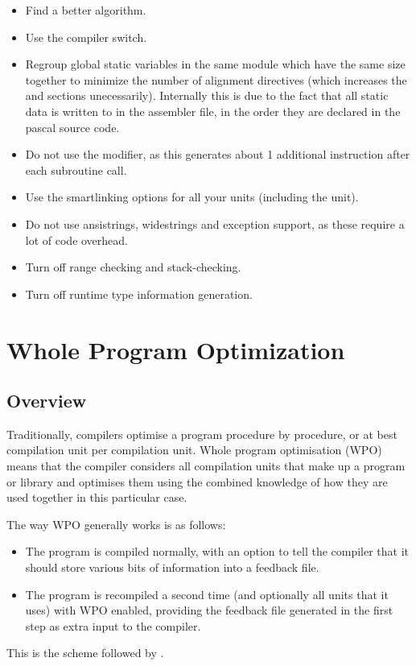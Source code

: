 \begin{itemize}

\item Find a better algorithm.

\item Use the  compiler switch.

\item Regroup global static variables in the same module which have the same
 size together to minimize the number of alignment directives (which increases
 the  and  sections unecessarily). Internally this is
 due to the fact that all static data is written to in the assembler file,
 in the order they are declared in the pascal source code.

\item Do not use the  modifier, as this generates
about 1 additional instruction after each subroutine call.

\item Use the smartlinking options for all your units
(including the  unit).

\item Do not use ansistrings, widestrings and exception support, as these 
require a lot of code overhead.

\item Turn off range checking and stack-checking.

\item Turn off runtime type information generation.

\end{itemize}

\section{Whole Program Optimization}
\label{se:WPO}

\subsection{Overview}
Traditionally, compilers optimise a program procedure by procedure, or at
best compilation unit per compilation unit. Whole program optimisation (WPO)
means that the compiler considers all compilation units that make up a
program or library and optimises them using the combined knowledge of how
they are used together in this particular case. 

The way WPO generally works is as follows: 
\begin{itemize}
\item The program is compiled normally, with an option to tell the compiler 
that it should store various bits of information into a feedback file.
\item The program is recompiled a second time (and optionally all units 
that it uses) with WPO enabled, providing the feedback file generated in the
first step as extra input to the compiler.
\end{itemize}
This is the scheme followed by \fpc.

